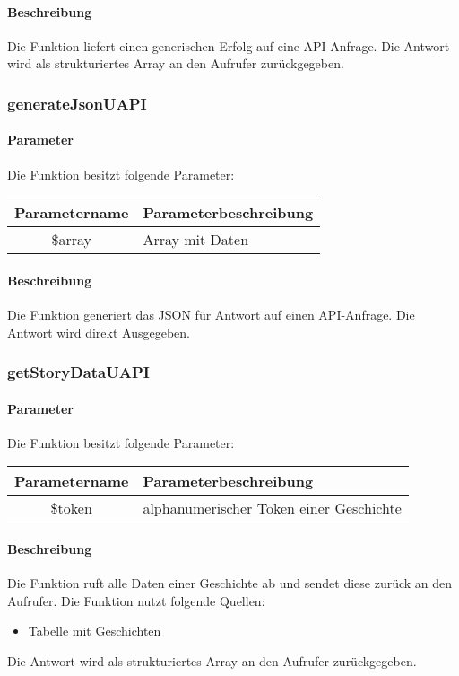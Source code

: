 \paragraph{Beschreibung} Die Funktion liefert einen generischen Erfolg auf eine API-Anfrage. Die Antwort wird als strukturiertes Array an den Aufrufer zurückgegeben.
\subsubsection{generateJsonUAPI}
\paragraph{Parameter} Die Funktion besitzt folgende Parameter:
\begin{table}[H]
	\begin{tabular}{|c|p{11cm}|}
		\hline
		\textbf{Parametername} & \textbf{Parameterbeschreibung} \\ \hline
		\$array & Array mit Daten \\ \hline
	\end{tabular}
\end{table}
\paragraph{Beschreibung} Die Funktion generiert das JSON für Antwort auf einen API-Anfrage. Die Antwort wird direkt Ausgegeben.
\subsubsection{getStoryDataUAPI}
\paragraph{Parameter} Die Funktion besitzt folgende Parameter:
\begin{table}[H]
	\begin{tabular}{|c|p{11cm}|}
		\hline
		\textbf{Parametername} & \textbf{Parameterbeschreibung} \\ \hline
		\$token & alphanumerischer Token einer Geschichte \\ \hline
	\end{tabular}
\end{table}
\paragraph{Beschreibung} Die Funktion ruft alle Daten einer Geschichte ab und sendet diese zurück an den Aufrufer. Die Funktion nutzt folgende Quellen:
\begin{itemize}
	\item Tabelle mit Geschichten
\end{itemize}
Die Antwort wird als strukturiertes Array an den Aufrufer zurückgegeben.
